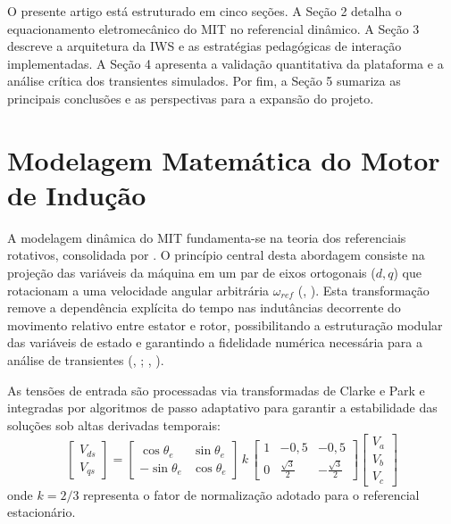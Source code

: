 \documentclass[a4paper]{ifacconf}
\begin{document}
O presente artigo está estruturado em cinco seções. A Seção 2 detalha o equacionamento eletromecânico do MIT no referencial dinâmico. A Seção 3 descreve a arquitetura da IWS e as estratégias pedagógicas de interação implementadas. A Seção 4 apresenta a validação quantitativa da plataforma e a análise crítica dos transientes simulados. Por fim, a Seção 5 sumariza as principais conclusões e as perspectivas para a expansão do projeto.

\section{Modelagem Matemática do Motor de Indução}

A modelagem dinâmica do MIT fundamenta-se na teoria dos referenciais rotativos, consolidada por \cite{KrauseThomas}. O princípio central desta abordagem consiste na projeção das variáveis da máquina em um par de eixos ortogonais ($d, q$) que rotacionam a uma velocidade angular arbitrária $\omega_{ref}$ (\citeauthor{usta2024mathematical}, \citeyear{usta2024mathematical}). Esta transformação remove a dependência explícita do tempo nas indutâncias decorrente do movimento relativo entre estator e rotor, possibilitando a estruturação modular das variáveis de estado e garantindo a fidelidade numérica necessária para a análise de transientes (\citeauthor{sengamalai2022three}, \citeyear{sengamalai2022three}; \citeauthor{leroux2022static}, \citeyear{leroux2022static}).

As tensões de entrada são processadas via transformadas de Clarke e Park e integradas por algoritmos de passo adaptativo para garantir a estabilidade das soluções sob altas derivadas temporais:
\begin{equation}
\label{eq:park}
\begin{bmatrix}V_{ds} \\ V_{qs}\end{bmatrix} = \begin{bmatrix}\cos\theta_e & \sin\theta_e \\ -\sin\theta_e & \cos\theta_e\end{bmatrix} \,k\, \begin{bmatrix}1 & -0,5 & -0,5 \\ 0 & \frac{\sqrt{3}}{2} & -\frac{\sqrt{3}}{2}\end{bmatrix} \begin{bmatrix}V_a \\ V_b \\ V_c\end{bmatrix}
\end{equation}
onde $k=2/3$ representa o fator de normalização adotado para o referencial estacionário. 
\end{document}
